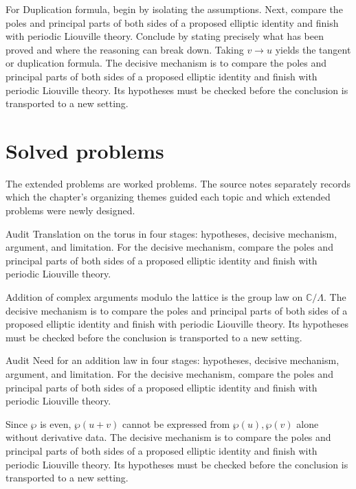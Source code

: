 \begin{example}\label{ex:iv30-worked-04}
For Duplication formula, begin by isolating the assumptions. Next, compare the poles and principal parts of both sides of a proposed elliptic identity and finish with periodic Liouville theory. Conclude by stating precisely what has been proved and where the reasoning can break down. Taking $v\to u$ yields the tangent or duplication formula. The decisive mechanism is to compare the poles and principal parts of both sides of a proposed elliptic identity and finish with periodic Liouville theory. Its hypotheses must be checked before the conclusion is transported to a new setting.
\end{example}

\section{Solved problems}
The extended problems are worked problems. The source notes separately records which the chapter's organizing themes guided each topic and which extended problems were newly designed.

\begin{problem}\label{prob:iv30-problem-01}
Audit Translation on the torus in four stages: hypotheses, decisive mechanism, argument, and limitation. For the decisive mechanism, compare the poles and principal parts of both sides of a proposed elliptic identity and finish with periodic Liouville theory.
\end{problem}
\begin{solution}
Addition of complex arguments modulo the lattice is the group law on $\mathbb C/\Lambda$. The decisive mechanism is to compare the poles and principal parts of both sides of a proposed elliptic identity and finish with periodic Liouville theory. Its hypotheses must be checked before the conclusion is transported to a new setting.
\end{solution}

\begin{problem}\label{prob:iv30-problem-02}
Audit Need for an addition law in four stages: hypotheses, decisive mechanism, argument, and limitation. For the decisive mechanism, compare the poles and principal parts of both sides of a proposed elliptic identity and finish with periodic Liouville theory.
\end{problem}
\begin{solution}
Since $\wp$ is even, $\wp(u+v)$ cannot be expressed from $\wp(u),\wp(v)$ alone without derivative data. The decisive mechanism is to compare the poles and principal parts of both sides of a proposed elliptic identity and finish with periodic Liouville theory. Its hypotheses must be checked before the conclusion is transported to a new setting.
\end{solution}

